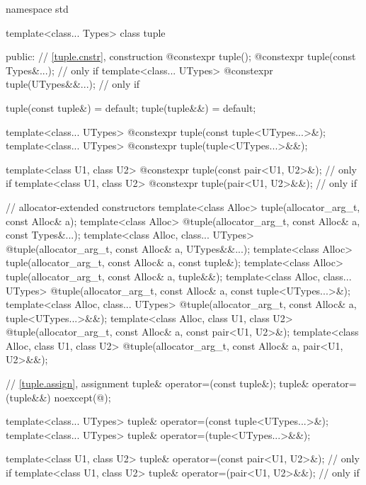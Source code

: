 \begin{codeblock}
namespace std {
  template<class... Types>
    class tuple {
    public:
      // \ref{tuple.cnstr},  construction
      @\EXPLICIT@ constexpr tuple();
      @\EXPLICIT@ constexpr tuple(const Types&...);         // only if 
      template<class... UTypes>
        @\EXPLICIT@ constexpr tuple(UTypes&&...);           // only if 

      tuple(const tuple&) = default;
      tuple(tuple&&) = default;

      template<class... UTypes>
        @\EXPLICIT@ constexpr tuple(const tuple<UTypes...>&);
      template<class... UTypes>
        @\EXPLICIT@ constexpr tuple(tuple<UTypes...>&&);

      template<class U1, class U2>
        @\EXPLICIT@ constexpr tuple(const pair<U1, U2>&);   // only if 
      template<class U1, class U2>
        @\EXPLICIT@ constexpr tuple(pair<U1, U2>&&);        // only if 

      // allocator-extended constructors
      template<class Alloc>
        tuple(allocator_arg_t, const Alloc& a);
      template<class Alloc>
        @\EXPLICIT@ tuple(allocator_arg_t, const Alloc& a, const Types&...);
      template<class Alloc, class... UTypes>
        @\EXPLICIT@ tuple(allocator_arg_t, const Alloc& a, UTypes&&...);
      template<class Alloc>
        tuple(allocator_arg_t, const Alloc& a, const tuple&);
      template<class Alloc>
        tuple(allocator_arg_t, const Alloc& a, tuple&&);
      template<class Alloc, class... UTypes>
        @\EXPLICIT@ tuple(allocator_arg_t, const Alloc& a, const tuple<UTypes...>&);
      template<class Alloc, class... UTypes>
        @\EXPLICIT@ tuple(allocator_arg_t, const Alloc& a, tuple<UTypes...>&&);
      template<class Alloc, class U1, class U2>
        @\EXPLICIT@ tuple(allocator_arg_t, const Alloc& a, const pair<U1, U2>&);
      template<class Alloc, class U1, class U2>
        @\EXPLICIT@ tuple(allocator_arg_t, const Alloc& a, pair<U1, U2>&&);

      // \ref{tuple.assign},  assignment
      tuple& operator=(const tuple&);
      tuple& operator=(tuple&&) noexcept(@\seebelow@);

      template<class... UTypes>
        tuple& operator=(const tuple<UTypes...>&);
      template<class... UTypes>
        tuple& operator=(tuple<UTypes...>&&);

      template<class U1, class U2>
        tuple& operator=(const pair<U1, U2>&);              // only if 
      template<class U1, class U2>
        tuple& operator=(pair<U1, U2>&&);                   // only if 

}}
\end{codeblock}
